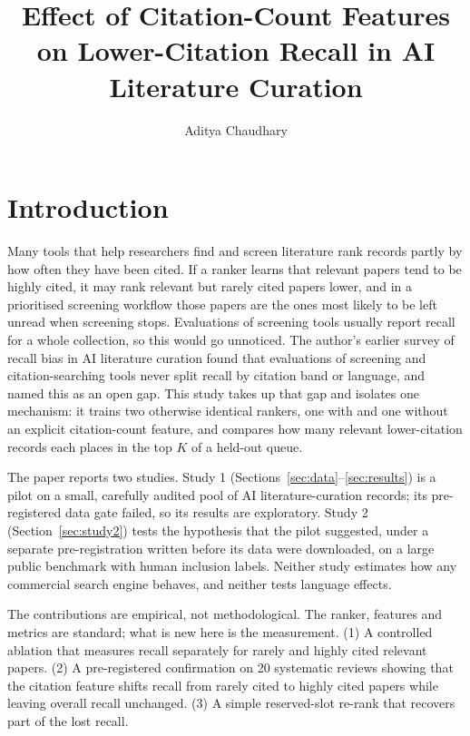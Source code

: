 \documentclass[acmsmall,screen,nonacm]{acmart}
\title{Effect of Citation-Count Features on Lower-Citation Recall in AI Literature Curation}
\author{Aditya Chaudhary}
\affiliation{%
  \institution{Indian Institute of Information Technology, Allahabad}
  \country{India}
}
\begin{document}
\maketitle
\setlength{\emergencystretch}{2em}

\section{Introduction}
\label{sec:intro}

Many tools that help researchers find and screen literature rank records partly by how often they have
been cited. If a ranker learns that relevant papers tend to be highly cited, it may rank relevant but
rarely cited papers lower, and in a prioritised screening workflow those papers are the ones most likely
to be left unread when screening stops. Evaluations of screening tools usually report recall for a whole
collection, so this would go unnoticed. The author's earlier survey of recall bias in AI literature
curation \cite{chaudhary2026recall} found that evaluations of screening and citation-searching tools never
split recall by citation band or language, and named this as an open gap. This study takes up that gap
and isolates one mechanism: it trains two otherwise identical rankers, one with and one without an
explicit citation-count feature, and compares how many relevant lower-citation records each places in the
top $K$ of a held-out queue.

The paper reports two studies. Study 1 (Sections~\ref{sec:data}--\ref{sec:results}) is a pilot on a
small, carefully audited pool of AI literature-curation records; its pre-registered data gate failed, so
its results are exploratory. Study 2 (Section~\ref{sec:study2}) tests the hypothesis that the pilot
suggested, under a separate pre-registration written before its data were downloaded, on a large public
benchmark with human inclusion labels. Neither study estimates how any commercial search engine behaves,
and neither tests language effects.

The contributions are empirical, not methodological. The ranker, features and metrics are standard; what
is new here is the measurement. (1) A controlled ablation that measures recall separately for rarely and
highly cited relevant papers. (2) A pre-registered confirmation on 20 systematic reviews showing that the
citation feature shifts recall from rarely cited to highly cited papers while leaving overall recall
unchanged. (3) A simple reserved-slot re-rank that recovers part of the lost recall.
\end{document}
